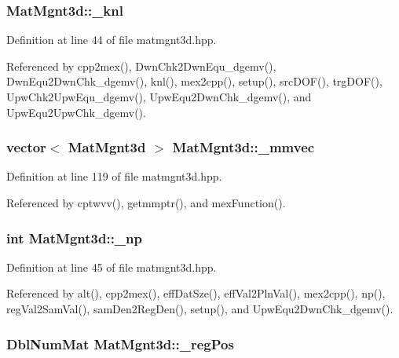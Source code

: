 \subsubsection{ {\bf Mat\-Mgnt3d::\_\-knl}}\label{classMatMgnt3d_cb56a4f532a89bc1a51ee17c2434a106_cb56a4f532a89bc1a51ee17c2434a106}




Definition at line 44 of file matmgnt3d.hpp.

Referenced by cpp2mex(), Dwn\-Chk2Dwn\-Equ\_\-dgemv(), Dwn\-Equ2Dwn\-Chk\_\-dgemv(), knl(), mex2cpp(), setup(), src\-DOF(), trg\-DOF(), Upw\-Chk2Upw\-Equ\_\-dgemv(), Upw\-Equ2Dwn\-Chk\_\-dgemv(), and Upw\-Equ2Upw\-Chk\_\-dgemv().
\subsubsection{\setlength{\rightskip}{0pt plus 5cm}vector$<$ {\bf Mat\-Mgnt3d} $>$ {\bf Mat\-Mgnt3d::\_\-mmvec}\hspace{0.3cm}{\tt  [static]}}\label{classMatMgnt3d_cb639bda4a8ef940adb1d3495123f208_cb639bda4a8ef940adb1d3495123f208}




Definition at line 119 of file matmgnt3d.hpp.

Referenced by cptwvv(), getmmptr(), and mex\-Function().
\subsubsection{\setlength{\rightskip}{0pt plus 5cm}int {\bf Mat\-Mgnt3d::\_\-np}}\label{classMatMgnt3d_3d05941198fa7da648bc68ddd5d0b5c1_3d05941198fa7da648bc68ddd5d0b5c1}




Definition at line 45 of file matmgnt3d.hpp.

Referenced by alt(), cpp2mex(), eff\-Dat\-Sze(), eff\-Val2Pln\-Val(), mex2cpp(), np(), reg\-Val2Sam\-Val(), sam\-Den2Reg\-Den(), setup(), and Upw\-Equ2Dwn\-Chk\_\-dgemv().
\subsubsection{\setlength{\rightskip}{0pt plus 5cm}Dbl\-Num\-Mat {\bf Mat\-Mgnt3d::\_\-reg\-Pos}}\label{classMatMgnt3d_afe2677ddc7bd25cc4255c723397bdd7_afe2677ddc7bd25cc4255c723397bdd7}


